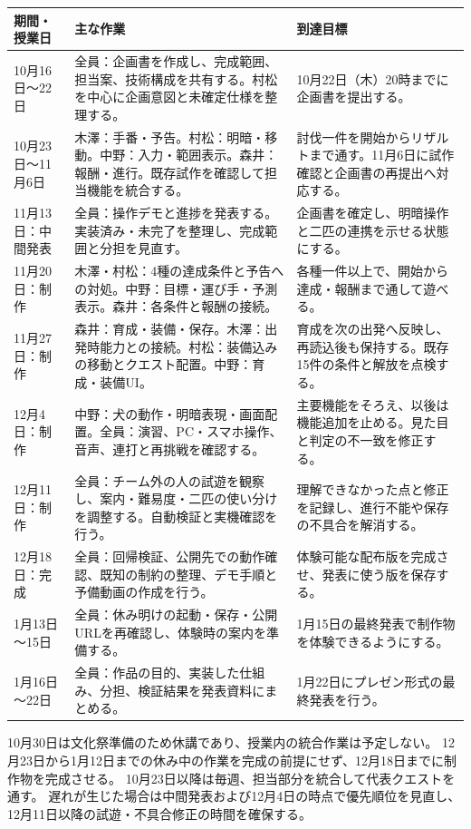\documentclass[a4paper,11pt,dvipdfmx]{jsarticle}
\begin{document}
\begin{tabularx}{\linewidth}{@{}p{25mm}Y Y@{}}
\toprule
期間・授業日 & 主な作業 & 到達目標 \\
\midrule
10月16日～22日 & 全員：企画書を作成し、完成範囲、担当案、技術構成を共有する。村松を中心に企画意図と未確定仕様を整理する。 & 10月22日（木）20時までに企画書を提出する。\\
10月23日～11月6日 & 木澤：手番・予告。村松：明暗・移動。中野：入力・範囲表示。森井：報酬・進行。既存試作を確認して担当機能を統合する。 & 討伐一件を開始からリザルトまで通す。11月6日に試作確認と企画書の再提出へ対応する。\\
11月13日：中間発表 & 全員：操作デモと進捗を発表する。実装済み・未完了を整理し、完成範囲と分担を見直す。 & 企画書を確定し、明暗操作と二匹の連携を示せる状態にする。\\
11月20日：制作 & 木澤・村松：4種の達成条件と予告への対処。中野：目標・運び手・予測表示。森井：各条件と報酬の接続。 & 各種一件以上で、開始から達成・報酬まで通して遊べる。\\
11月27日：制作 & 森井：育成・装備・保存。木澤：出発時能力との接続。村松：装備込みの移動とクエスト配置。中野：育成・装備UI。 & 育成を次の出発へ反映し、再読込後も保持する。既存15件の条件と解放を点検する。\\
12月4日：制作 & 中野：犬の動作・明暗表現・画面配置。全員：演習、PC・スマホ操作、音声、連打と再挑戦を確認する。 & 主要機能をそろえ、以後は機能追加を止める。見た目と判定の不一致を修正する。\\
12月11日：制作 & 全員：チーム外の人の試遊を観察し、案内・難易度・二匹の使い分けを調整する。自動検証と実機確認を行う。 & 理解できなかった点と修正を記録し、進行不能や保存の不具合を解消する。\\
12月18日：完成 & 全員：回帰検証、公開先での動作確認、既知の制約の整理、デモ手順と予備動画の作成を行う。 & 体験可能な配布版を完成させ、発表に使う版を保存する。\\
1月13日～15日 & 全員：休み明けの起動・保存・公開URLを再確認し、体験時の案内を準備する。 & 1月15日の最終発表で制作物を体験できるようにする。\\
1月16日～22日 & 全員：作品の目的、実装した仕組み、分担、検証結果を発表資料にまとめる。 & 1月22日にプレゼン形式の最終発表を行う。\\
\bottomrule
\end{tabularx}

10月30日は文化祭準備のため休講であり、授業内の統合作業は予定しない。
12月23日から1月12日までの休み中の作業を完成の前提にせず、12月18日までに制作物を完成させる。
10月23日以降は毎週、担当部分を統合して代表クエストを通す。
遅れが生じた場合は中間発表および12月4日の時点で優先順位を見直し、12月11日以降の試遊・不具合修正の時間を確保する。
\end{document}
